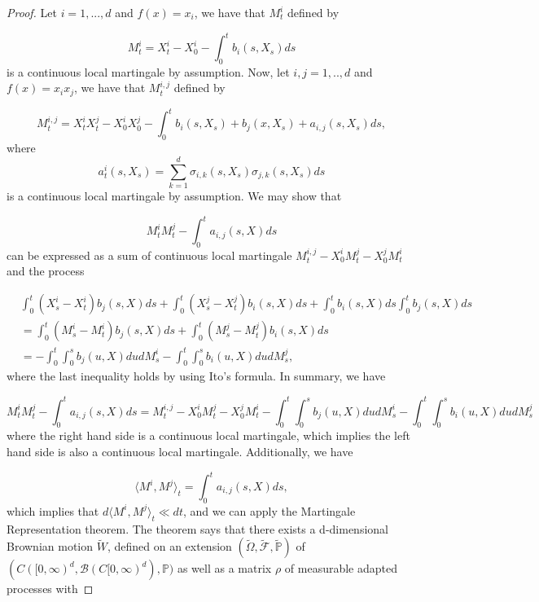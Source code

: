 \documentclass{article}
\begin{document}
\begin{proof}
Let $i={1,...,d}$ and $f(x)=x_i$, we have that $M^i_t$ defined by 

\begin{equation} \label{mart_prob_thm_cond_1}
M^i_t=X_t^i-X_0^i-\int^t_0b_i(s,X_s)ds
\end{equation}
is a continuous local martingale by assumption. Now, let $i,j={1,..,d}$ and $f(x)=x_ix_j$, we have that $M^{i,j}_t$ defined by 

\begin{equation*}
M^{i,j}_t=X_t^iX_t^j-X_0^iX_0^j-\int^t_0b_i(s,X_s)+b_j(x,X_s)+a_{i,j}(s,X_s)ds,
\end{equation*}
where 
\begin{equation*}
a^i_t(s,X_s)=\sum^d_{k=1}\sigma_{i,k}(s,X_s)\sigma_{j,k}(s,X_s)ds
\end{equation*}
is a continuous local martingale by assumption. We may show that 

\begin{equation*}
M^i_tM^j_t-\int^t_0a_{i,j}(s,X)ds
\end{equation*}
can be expressed as a sum of continuous local martingale $M^{i,j}_t-X_0^iM^j_t-X_0^jM^i_t$ and the process

\begin{equation*}
\begin{aligned}
&\int^t_0(X_s^i-X_t^i)b_j(s,X)ds+\int^t_0(X_s^j-X_t^j)b_i(s,X)ds+\int^t_0b_i(s,X)ds\int^t_0b_j(s,X)ds\\
&=\int^t_0(M_s^i-M_t^i)b_j(s,X)ds+\int^t_0(M_s^j-M_t^j)b_i(s,X)ds\\
&=-\int^t_0\int^s_0b_j(u,X)dudM_s^i-\int^t_0\int^s_0b_i(u,X)dudM_s^j,
\end{aligned}
\end{equation*}
where the last inequality holds by using Ito's formula. In summary, we have

\begin{equation*}
M^i_tM^j_t-\int^t_0a_{i,j}(s,X)ds=M^{i,j}_t-X_0^iM^j_t-X_0^jM^i_t-\int^t_0\int^s_0b_j(u,X)dudM_s^i-\int^t_0\int^s_0b_i(u,X)dudM_s^j
\end{equation*}
where the right hand side is a continuous local martingale, which implies the left hand side is also a continuous local martingale. Additionally, we have

\begin{equation} \label{mart_prob_thm_cond_2}
\langle M^i,M^j\rangle_t=\int^t_0a_{i,j}(s,X)ds,
\end{equation}
which implies that $d\langle M^i,M^j\rangle_t\ll dt$, and we can apply the Martingale Representation theorem. The theorem says that there exists a d-dimensional Brownian motion $\tilde{W}$, defined on an extension $(\tilde{\Omega},\tilde{\mathcal{F}},\tilde{\mathbb{P}})$ of $(C([0,\infty)^d,\mathcal{B}(C[0,\infty)^d),\mathbb{P})$ as well as a matrix $\rho$ of measurable adapted processes with 


\end{proof}
\end{document}
